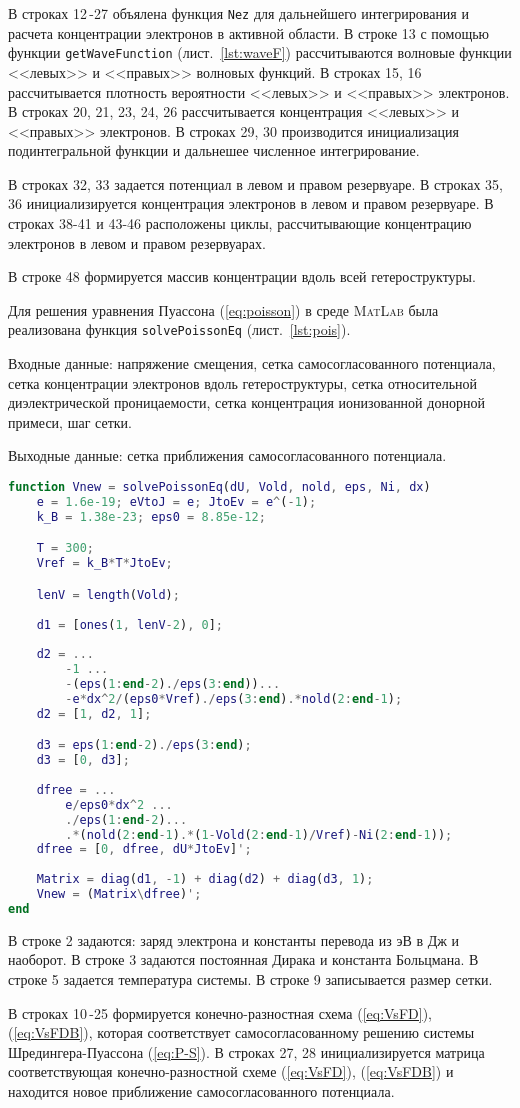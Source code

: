 В строках 12\,-27 объялена функция \texttt{Nez} для дальнейшего интегрирования и расчета концентрации электронов в активной области. В строке 13 с помощью функции \texttt{getWaveFunction} (лист.~\ref{lst:waveF}) рассчитываются волновые функции <<левых>> и <<правых>> волновых функций. В строках 15, 16 рассчитывается плотность вероятности <<левых>> и <<правых>> электронов. В строках 20, 21, 23, 24, 26 рассчитывается концентрация <<левых>> и <<правых>> электронов. В строках 29, 30 производится инициализация подинтегральной функции и дальнешее численное интегрирование.

В строках 32, 33 задается потенциал в левом и правом резервуаре. В строках 35, 36 инициализируется концентрация электронов в левом и правом резервуаре. В строках 38-41 и 43-46 расположены циклы, рассчитывающие концентрацию электронов в левом и правом резервуарах.

В строке 48 формируется массив концентрации вдоль всей гетероструктуры.

Для решения уравнения Пуассона (\ref{eq:poisson}) в среде \textsc{MatLab} была реализована функция \texttt{solvePoissonEq} (лист.~\ref{lst:pois}).

Входные данные: напряжение смещения, сетка самосогласованного потенциала, сетка концентрации электронов вдоль гетероструктуры, сетка относительной диэлектрической проницаемости, сетка концентрация ионизованной донорной примеси, шаг сетки.

Выходные данные: сетка приближения самосогласованного потенциала.

\begin{lstlisting}[style=realcode,language=Matlab,caption={Решение уравнения Пуассона},label={lst:pois}]
function Vnew = solvePoissonEq(dU, Vold, nold, eps, Ni, dx)
	e = 1.6e-19; eVtoJ = e; JtoEv = e^(-1); 	
	k_B = 1.38e-23; eps0 = 8.85e-12;

	T = 300;
	Vref = k_B*T*JtoEv;

	lenV = length(Vold);
	
	d1 = [ones(1, lenV-2), 0];
	
	d2 = ...
		-1 ...
		-(eps(1:end-2)./eps(3:end))...
		-e*dx^2/(eps0*Vref)./eps(3:end).*nold(2:end-1);
	d2 = [1, d2, 1];

	d3 = eps(1:end-2)./eps(3:end);
	d3 = [0, d3];
	
	dfree = ...
		e/eps0*dx^2 ...
		./eps(1:end-2)...
		.*(nold(2:end-1).*(1-Vold(2:end-1)/Vref)-Ni(2:end-1));
	dfree = [0, dfree, dU*JtoEv]';
	
	Matrix = diag(d1, -1) + diag(d2) + diag(d3, 1);
	Vnew = (Matrix\dfree)';
end
\end{lstlisting}
В строке 2 задаются: заряд электрона и константы перевода из эВ в Дж и наоборот. В строке 3 задаются постоянная Дирака и константа Больцмана. В строке 5 задается температура системы. В строке 9 записывается размер сетки.

В строках 10\,-25 формируется конечно-разностная схема (\ref{eq:VsFD}), (\ref{eq:VsFDB}), которая соответствует самосогласованному решению системы Шредингера-Пуассона (\ref{eq:P-S}). В строках 27, 28 инициализируется матрица соответствующая конечно-разностной схеме (\ref{eq:VsFD}), (\ref{eq:VsFDB}) и находится новое приближение самосогласованного потенциала.